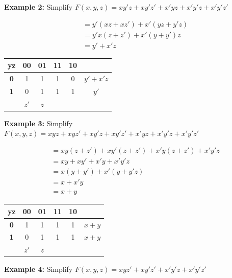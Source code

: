\bigskip
\noindent\textbf{Example 2:} Simplify $F(x,y,z) = xy'z + xy'z' + x'yz + x'y'z + x'y'z'$

\begin{align*}
    &= y'(xz + xz') + x'(yz + y'z) \\
    &= y'x(z + z') + x'(y + y')z \\
    &= y' + x'z
\end{align*}

\begin{center}
\begin{tabular}{c|cccc|c}
    \textbf{yz} & \textbf{00} & \textbf{01} & \textbf{11} & \textbf{10} & \\
    \hline
    \textbf{0} & 1          & 1          & 1          & 0          & $y' + x'z$ \\
    \textbf{1} & 0          & 1          & 1          & 1          & $y'$ \\
    \hline
               & $z'$       & $z$        &            &            & 
\end{tabular}
\end{center}

\bigskip
\noindent\textbf{Example 3:} Simplify $F(x,y,z) = xyz + xyz' + xy'z + xy'z' + x'yz + x'y'z + x'y'z'$

\begin{align*}
    &= xy(z + z') + xy'(z + z') + x'y(z + z') + x'y'z \\
    &= xy + xy' + x'y + x'y'z \\
    &= x(y + y') + x'(y + y'z) \\
    &= x + x'y \\
    &= x + y
\end{align*}

\begin{center}
\begin{tabular}{c|cccc|c}
    \textbf{yz} & \textbf{00} & \textbf{01} & \textbf{11} & \textbf{10} & \\
    \hline
    \textbf{0} & 1          & 1          & 1          & 1          & $x + y$ \\
    \textbf{1} & 0          & 1          & 1          & 1          & $x + y$ \\
    \hline
               & $z'$       & $z$        &            &            & 
\end{tabular}
\end{center}

\bigskip
\noindent\textbf{Example 4:} Simplify $F(x,y,z) = xyz' + xy'z' + x'y'z + x'y'z'$

